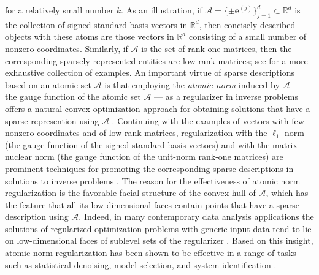 \documentclass[11pt,letterpaper]{article}
\newcommand{\R}{\mathbb{R}}
\newcommand{\A}{\mathcal{A}}
\newcommand{\be}{\mathbf{e}}
\begin{document}
for a relatively small number $k$.  As an illustration, if $\A =\{\pm \be^{(j)}\}_{j=1}^d \subset \R^d$ is the collection of signed standard basis vectors in $\R^d$, then concisely described objects with these atoms are those vectors in $\R^d$ consisting of a small number of nonzero coordinates.  Similarly, if $\A$ is the set of rank-one matrices, then the corresponding sparsely represented entities are low-rank matrices; see \cite{CRPW:12} for a more exhaustive collection of examples.  An important virtue of sparse descriptions based on an atomic set $\A$ is that employing the \emph{atomic norm} induced by $\A$ --- the gauge function of the atomic set $\A$ --- as a regularizer in inverse problems offers a natural convex optimization approach for obtaining solutions that have a sparse represention using $\A$ \cite{CRPW:12}.  Continuing with the examples of vectors with few nonzero coordinates and of low-rank matrices, regularization with the $\ell_1$ norm (the gauge function of the signed standard basis vectors) and with the matrix nuclear norm (the gauge function of the unit-norm rank-one matrices) are prominent techniques for promoting the corresponding sparse descriptions in solutions to inverse problems \cite{CanRec:09,CRT:06,CDS:98,Don:06,Faz:02,MeiBuh:06,RFP:10,Tib:94}.  The reason for the effectiveness of atomic norm regularization is the favorable facial structure of the convex hull of $\A$, which has the feature that all its low-dimensional faces contain points that have a sparse description using $\A$.  Indeed, in many contemporary data analysis applications the solutions of regularized optimization problems with generic input data tend to lie on low-dimensional faces of sublevel sets of the regularizer \cite{CT:06,Don:06,RFP:10}.  Based on this insight, atomic norm regularization has been shown to be effective in a range of tasks such as statistical denoising, model selection, and system identification \cite{BTR:13,OymHas:16,SBTR:12}.


\end{document}
